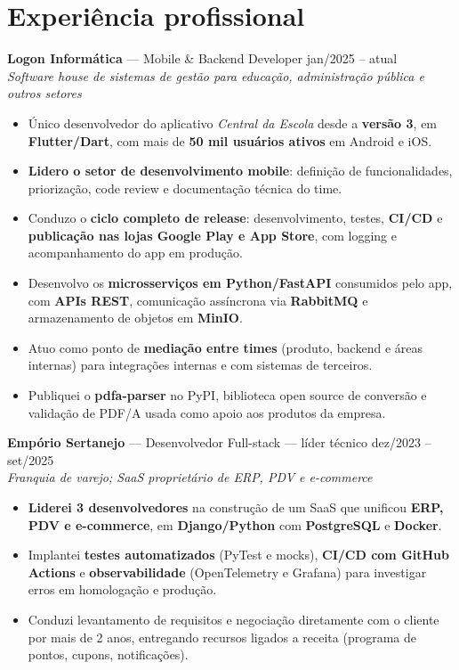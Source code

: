 \documentclass[10.5pt,a4paper]{article}
\newcommand{\cargo}[4]{%
  \Needspace*{5\baselineskip}%
  \textbf{#1} \textnormal{---} #2 \hfill \textnormal{#3}\\
  \textit{\small #4}\vspace{0.4ex}
}
\begin{document}
\section*{Experiência profissional}

\cargo{Logon Informática}{Mobile \& Backend Developer}{jan/2025 -- atual}{Software house de
sistemas de gestão para educação, administração pública e outros setores}
\begin{itemize}
  \item Único desenvolvedor do aplicativo \textit{Central da Escola} desde a \textbf{versão 3}, em
        \textbf{Flutter/Dart}, com mais de \textbf{50 mil usuários ativos} em Android e iOS.
  \item \textbf{Lidero o setor de desenvolvimento mobile}: definição de funcionalidades,
        priorização, code review e documentação técnica do time.
  \item Conduzo o \textbf{ciclo completo de release}: desenvolvimento, testes, \textbf{CI/CD} e
        \textbf{publicação nas lojas Google Play e App Store}, com logging e acompanhamento do app
        em produção.
  \item Desenvolvo os \textbf{microsserviços em Python/FastAPI} consumidos pelo app, com
        \textbf{APIs REST}, comunicação assíncrona via \textbf{RabbitMQ} e armazenamento de objetos
        em \textbf{MinIO}.
  \item Atuo como ponto de \textbf{mediação entre times} (produto, backend e áreas internas) para
        integrações internas e com sistemas de terceiros.
  \item Publiquei o \textbf{pdfa-parser} no PyPI, biblioteca open source de conversão e validação de
        PDF/A usada como apoio aos produtos da empresa.
\end{itemize}

\cargo{Empório Sertanejo}{Desenvolvedor Full-stack --- líder técnico}{dez/2023 -- set/2025}{Franquia
de varejo; SaaS proprietário de ERP, PDV e e-commerce}
\begin{itemize}
  \item \textbf{Liderei 3 desenvolvedores} na construção de um SaaS que unificou \textbf{ERP, PDV e
        e-commerce}, em \textbf{Django/Python} com \textbf{PostgreSQL} e \textbf{Docker}.
  \item Implantei \textbf{testes automatizados} (PyTest e mocks), \textbf{CI/CD com GitHub Actions}
        e \textbf{observabilidade} (OpenTelemetry e Grafana) para investigar erros em homologação e
        produção.
  \item Conduzi levantamento de requisitos e negociação diretamente com o cliente por mais de
        2 anos, entregando recursos ligados a receita (programa de pontos, cupons, notificações).
\end{itemize}
\end{document}
